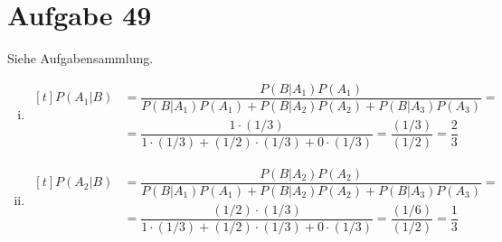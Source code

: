 \section{Aufgabe 49}
\setcounter{section}{49}

Siehe Aufgabensammlung.
\begin{enumerate}[i)]
    \item
        $\begin{aligned}[t]
            P(A_1|B) &= \dfrac{P(B|A_1)P(A_1)}{P(B|A_1)P(A_1) + P(B|A_2)P(A_2) + P(B|A_3)P(A_3)} = \\
                     &= \dfrac{1 \cdot (1/3)}{1 \cdot (1/3) + (1/2) \cdot (1/3) + 0 \cdot (1/3)} = \dfrac{(1 / 3)}{(1/2)} = \dfrac{2}{3}
        \end{aligned}$
    \item
        $\begin{aligned}[t]
            P(A_2|B) &= \dfrac{P(B|A_2)P(A_2)}{P(B|A_1)P(A_1) + P(B|A_2)P(A_2) + P(B|A_3)P(A_3)} = \\
                     &= \dfrac{(1/2) \cdot (1/3)}{1 \cdot (1/3) + (1/2) \cdot (1/3) + 0 \cdot (1/3)} = \dfrac{(1/6)}{(1/2)} = \dfrac{1}{3}
        \end{aligned}$
\end{enumerate}
